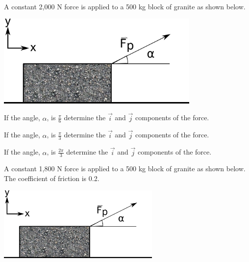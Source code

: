 




\begin{problem}
\item A constant 2,000 N force is applied to a 500 kg block of granite as shown
  below.

  \includegraphics[width=10cm]{ink/week7/dragBlock}

  \begin{subproblem}
  \item If the angle, $\alpha$, is $\frac{\pi}{6}$ determine the
    $\vec{i}$ and $\vec{j}$ components of the force.
    \vfill
  \item If the angle, $\alpha$, is $\frac{\pi}{3}$ determine the
    $\vec{i}$ and $\vec{j}$ components of the force.
    \vfill
  \item If the angle, $\alpha$, is $\frac{2\pi}{3}$ determine the
    $\vec{i}$ and $\vec{j}$ components of the force.
    \vfill
  \end{subproblem}

  \clearpage

\item A constant 1,800 N force is applied to a 500 kg block of granite as
  shown below. The coefficient of friction is 0.2.

  \includegraphics[width=8cm]{ink/week7/dragBlock}


\end{problem}

